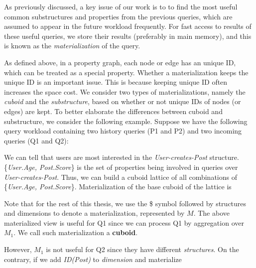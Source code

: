 As previously discussed, a key issue of our work is to to find the most useful common substructures and properties from the previous queries, which are assumed to appear in the future workload frequently. For fast access to results of these useful queries, we store their results (preferably in main memory), and this is known as the \textit{materialization} of the query. 

As defined above, in a property graph, each node or edge has an unique ID, which can be treated as a special property. Whether a materialization keeps the unique ID is an important issue. This is because keeping unique ID often increases the space cost. We consider two types of materializations, namely the \emph{cuboid} and the \emph{substructure}, based on whether or not unique IDs of nodes (or edges) are kept. To better elaborate the differences between cuboid and substructure, we consider the following example. Suppose we have the following query workload containing two history queries (P1 and P2) and two incoming queries (Q1 and Q2):









We can tell that users are most interested in  the \textit{User-creates-Post} structure. \{\emph{User.Age, Post.Score}\} is the set of properties being involved in queries over \textit{User-creates-Post}. Thus, we can build a cuboid lattice of all combinations of  \{\emph{User.Age, Post.Score}\}. Materialization of the base cuboid of the lattice is


\noindent Note that for the rest of this thesis, we use the \$ symbol followed by structures and dimensions to denote a materialization, represented by $M$. The above materialized view is useful for Q1 since we can process Q1 by aggregation over $M_1$. We call such materialization a \textbf{cuboid}.


However, $M_1$ is not useful for Q2 since they have different \textit{structures}. On the contrary, if we add \textit{ID(Post)} to \textit{dimension} and materialize

